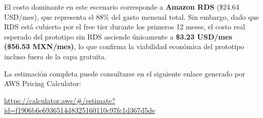 El costo dominante en este escenario corresponde a \textbf{Amazon RDS}
(\$24.64 USD/mes), que representa el 88\% del gasto mensual total.
Sin embargo, dado que RDS está cubierto por el free tier durante los
primeros 12 meses, el costo real esperado del prototipo sin RDS
asciende únicamente a \textbf{\$3.23 USD/mes (\$56.53 MXN/mes)},
lo que confirma la viabilidad económica del prototipo incluso fuera
de la capa gratuita.

La estimación completa puede consultarse en el siguiente enlace
generado por AWS Pricing Calculator:

\begin{center}
\url{https://calculator.aws/#/estimate?id=f1906b6e6936514d8325160110c97fc1d367d5de}
\end{center}
\cite{aws_calculator_prototipo}